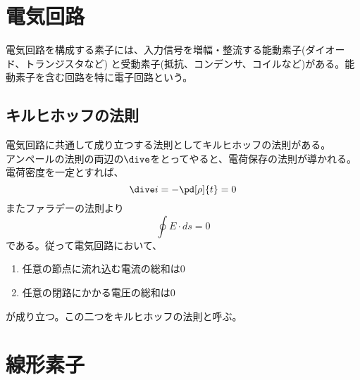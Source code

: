 
\section{電気回路}
    電気回路を構成する素子には、入力信号を増幅・整流する能動素子(ダイオード、トランジスタなど)
    と受動素子(抵抗、コンデンサ、コイルなど)がある。能動素子を含む回路を特に電子回路という。
    \subsection{キルヒホッフの法則}
        電気回路に共通して成り立つする法則としてキルヒホッフの法則がある。\\
        アンペールの法則の両辺の$\dive$をとってやると、電荷保存の法則が導かれる。
        電荷密度を一定とすれば、
            \[\dive i = -\pd[\rho]{t} = 0\]
        またファラデーの法則より
            \[\oint E\cdot ds = 0\]
        である。従って電気回路において、
        \begin{enumerate}
            \item 任意の節点に流れ込む電流の総和は0
            \item 任意の閉路にかかる電圧の総和は0
        \end{enumerate}
        が成り立つ。この二つをキルヒホッフの法則と呼ぶ。

\section{線形素子}
